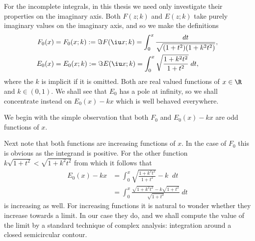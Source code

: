 For the incomplete integrals, in this thesis we need only investigate their properties on the imaginary axis. Both $F(z;k)$ and $E(z;k)$ take purely imaginary values on the imaginary axis, and so we make the definitions
\begin{align}
F_0(x) &= F_0 (x ; k) := \Im F(\iu x; k)
= \int_0^x \frac{dt}{\sqrt{(1+t^2)(1+k^2 t^2)}}, \\
E_0(x) &= E_0 (x ; k) := \Im E(\iu x; k)
= \int_0^x \sqrt{\frac{1+k^2t^2}{1+t^2}}\;dt,
\end{align}
where the $k$ is implicit if it is omitted. Both are real valued functions of $x \in \R$ and $k\in (0,1)$. We shall see that $E_0$ has a pole at infinity, so we shall concentrate instead on $E_0(x) - k x$ which is well behaved everywhere.

We begin with the simple observation that both $F_0$ and $E_0(x) - kx$ are odd functions of $x$.

Next note that both functions are increasing functions of $x$. In the case of $F_0$ this is obvious as the integrand is positive. For the other function $k \sqrt{1 + t^2} < \sqrt{1 + k^2t^2}$ from which it follows that
\begin{align*}
E_0(x) - k x
&= \int_0^x \sqrt{\frac{1+k^2t^2}{1+t^2}} - k \;\;dt\\
&= \int_0^x \frac{\sqrt{1+k^2t^2} - k\sqrt{1+t^2}}{\sqrt{1+t^2}}\;dt
\end{align*}
is increasing as well. For increasing functions it is natural to wonder whether they increase towards a limit. In our case they do, and we shall compute the value of the limit by a standard technique of complex analysis: integration around a closed semicircular contour.

